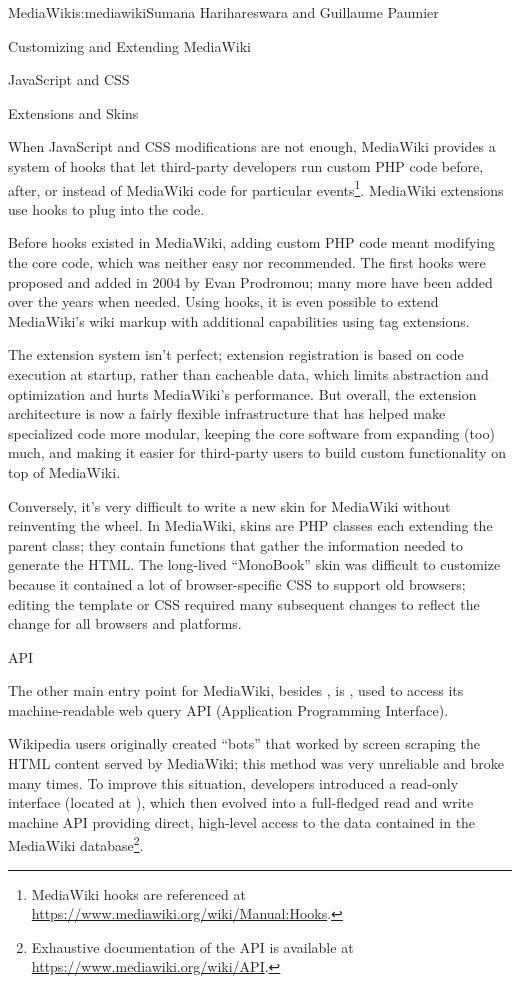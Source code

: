 \begin{aosachapter}{MediaWiki}{s:mediawiki}{Sumana Harihareswara and Guillaume Paumier}
\begin{aosasect1}{Customizing and Extending MediaWiki}
\begin{aosasect2}{JavaScript and CSS}
\end{aosasect2}

\begin{aosasect2}{Extensions and Skins}

When JavaScript and CSS modifications are not enough, MediaWiki
provides a system of hooks that let third-party developers run custom
PHP code before, after, or instead of MediaWiki code for particular
events\footnote{MediaWiki hooks are referenced at
  \url{https://www.mediawiki.org/wiki/Manual:Hooks}.}. MediaWiki
extensions use hooks to plug into the code.

Before hooks existed in MediaWiki, adding custom PHP code meant
modifying the core code, which was neither easy nor recommended. The
first hooks were proposed and added in 2004 by Evan Prodromou; many
more have been added over the years when needed. Using hooks, it is
even possible to extend MediaWiki's wiki markup with additional
capabilities using tag extensions.

The extension system isn't perfect; extension registration is based on
code execution at startup, rather than cacheable data, which limits
abstraction and optimization and hurts MediaWiki's performance. But
overall, the extension architecture is now a fairly flexible
infrastructure that has helped make specialized code more modular,
keeping the core software from expanding (too) much, and making it
easier for third-party users to build custom functionality on top of
MediaWiki.

Conversely, it's very difficult to write a new skin for MediaWiki
without reinventing the wheel. In MediaWiki, skins are PHP classes
each extending the parent  class; they contain functions
that gather the information needed to generate the HTML. The
long-lived ``MonoBook'' skin was difficult to customize because it
contained a lot of browser-specific CSS to support old browsers;
editing the template or CSS required many subsequent changes to
reflect the change for all browsers and platforms.

\end{aosasect2}

\begin{aosasect2}{API}

The other main entry point for MediaWiki, besides , is
, used to access its machine-readable web query API
(Application Programming Interface).

Wikipedia users originally created ``bots'' that worked by screen
scraping the HTML content served by MediaWiki; this method was very
unreliable and broke many times. To improve this situation, developers
introduced a read-only interface (located at ), which
then evolved into a full-fledged read and write machine API providing
direct, high-level access to the data contained in the MediaWiki
database\footnote{Exhaustive documentation of the API is available at
  \url{https://www.mediawiki.org/wiki/API}.}.


\end{aosasect2}
\end{aosasect1}
\end{aosachapter}
